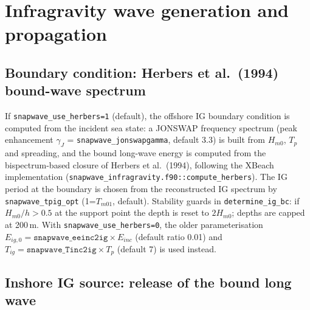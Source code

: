 \documentclass[11pt,a4paper]{article}
\newcommand{\code}[1]{\texttt{#1}}
\begin{document}
\section{Infragravity wave generation and propagation}
\label{sec:ig}

\subsection{Boundary condition: Herbers et al.\ (1994) bound-wave spectrum}

If \code{snapwave\_use\_herbers=1} (default), the offshore IG boundary
condition is computed from the incident sea state: a JONSWAP frequency spectrum
(peak enhancement $\gamma_J$ = \code{snapwave\_jonswapgamma}, default 3.3) is
built from $H_{m0}$, $T_p$ and spreading, and the bound long-wave energy is
computed from the bispectrum-based closure of Herbers et al.\ (1994), following
the XBeach implementation (\code{snapwave\_infragravity.f90::compute\_herbers}).
The IG period at the boundary is chosen from the reconstructed IG spectrum by
\code{snapwave\_tpig\_opt} (1=$T_{m01}$, default). Stability guards in
\code{determine\_ig\_bc}: if $H_{m0}/h>0.5$ at the support point the depth is
reset to $2H_{m0}$; depths are capped at 200\,m. With
\code{snapwave\_use\_herbers=0}, the older parameterisation
$E_{ig,0}=\code{snapwave\_eeinc2ig}\times E_{inc}$ (default ratio 0.01) and
$T_{ig}= \code{snapwave\_Tinc2ig}\times T_p$ (default 7) is used instead.

\subsection{Inshore IG source: release of the bound long wave}
\end{document}
